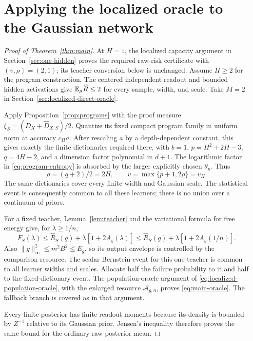 \section{Applying the localized oracle to the Gaussian network}
\label{sec:assembly}
\begin{proof}[Proof of Theorem~\ref{thm:main}]
At $H=1$, the localized capacity argument in Section~\ref{sec:one-hidden} proves the required raw-risk certificate with $(v,\rho)=(2,1)$; its teacher conversion below is unchanged. Assume $H\ge2$ for the program construction. The centered independent readout and bounded hidden activations give
$\mathbb E_\mu\widehat R\le2$ for every sample, width, and scale. Take $M=2$ in Section~\ref{sec:localized-direct-oracle}.

Apply Proposition~\ref{prop:programs} with the proof measure
$\xi_S=(D_X+\widehat D_{X,S})/2$. Quantize its fixed compact program family in uniform norm at accuracy $c_Ha$. After rescaling $a$ by a depth-dependent constant, this gives exactly the finite dictionaries required there, with $b=1$, $p=H^2+2H-3$, $q=4H-2$, and a dimension factor polynomial in $d+1$. The logarithmic factor in \eqref{eq:program-entropy} is absorbed by the larger explicitly chosen $\theta_n$. Thus
\[
 \rho=(q+2)/2=2H,\qquad v=\max\{p+1,2\rho\}=v_H.
\]
The same dictionaries cover every finite width and Gaussian scale. The statistical event is consequently common to all these learners; there is no union over a continuum of priors.

For a fixed teacher, Lemma~\ref{lem:teacher} and the variational formula for free energy give, for $\lambda\ge1/n$,
\[
 F_S(\lambda)\le\widehat R_S(g)+\lambda[1+2A_g(\lambda)]
 \le\widehat R_S(g)+\lambda[1+2A_g(1/n)].
\]
Also $\|g\|_\infty^2\le m^2B^2\le E_g$, so its output envelope is controlled by the comparison resource. The scalar Bernstein event for this one teacher is common to all learner widths and scales. Allocate half the failure probability to it and half to the fixed-dictionary event. The population-oracle argument of \eqref{eq:localized-population-oracle}, with the enlarged resource $\mathcal A_{g,n}$, proves \eqref{eq:main-oracle}. The fallback branch is covered as in that argument.

Every finite posterior has finite readout moments because its density is bounded by $Z^{-1}$ relative to its Gaussian prior. Jensen's inequality therefore proves the same bound for the ordinary raw posterior mean.
\end{proof}

